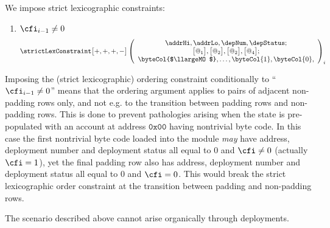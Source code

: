 We impose strict lexicographic constraints:
\begin{enumerate}
	\item \If $\cfi_{i - 1} \neq 0$ \Then
	\[
		\strictLexConstraint\big[ +, +, +, - \big]
		\left(
		\begin{array}{c}
			\addrHi, \addrLo, \depNum, \depStatus; \\
			\big[@_{1}\big], \big[@_{2}\big], \big[@_{2}\big], \big[@_{4}\big]; \\
			\byteCol{$\llargeMO$}, \dots, \byteCol{1}, \byteCol{0}, \\
		\end{array}
		\right)_{i}
	\]
\end{enumerate}

\saNote{}
Imposing the (strict lexicographic) ordering constraint conditionally to ``$\cfi_{i - 1} \neq 0$'' means that the ordering argument applies to pairs of adjacent non-padding rows only, and not e.g. to the transition between padding rows and non-padding rows.
This is done to prevent pathologies arising when the state is pre-populated with an account at address $\texttt{0x00}$ having nontrivial byte code.
In this case the first nontrivial byte code loaded into the \romMod{} module \emph{may} have address, deployment number and deployment status all equal to 0 and $\cfi \neq 0$ (actually $\cfi = 1$),
yet the final padding row also has address, deployment number and deployment status all equal to $0$ and $\cfi = 0$.
This would break the strict lexicographic order constraint at the transition between padding and non-padding rows.

\saNote{}
The scenario described above cannot arise organically through deployments.